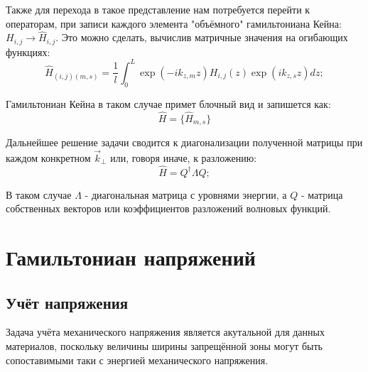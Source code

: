 \documentclass[../main.tex]{subfiles}
\begin{document}
    Также для перехода в такое представление нам потребуется перейти к операторам,
    при записи каждого элемента "объёмного" гамильтониана Кейна: 
    $H_{i,j} \rightarrow \hat{H}_{i,j}$. Это можно сделать, вычислив матричные 
    значения на огибающих функциях:
    \begin{equation}
        \hat{H}_{(i, j)(m, s)} = \frac{1}{l} \int_0^L \exp(- i k_{z, m} z) H_{i,j}(z)
            \exp(i k_{z, s} z) dz;
    \end{equation}

    Гамильтониан Кейна в таком случае примет блочный вид и запишется как:
    \begin{equation}
        \hat H = \{\hat{H}_{m, s}\}
    \end{equation}

    Дальнейшее решение задачи сводится к диагонализации полученной матрицы при 
    каждом конкретном $\vec{k}_\perp$ или, говоря иначе, к разложению:
    \begin{equation*}
        \hat H = Q^{\dagger} \Lambda Q;
    \end{equation*}
     
    В таком случае $\Lambda$ - диагональная матрица с уровнями энергии, а $Q$ - 
    матрица собственных векторов или коэффициентов разложений волновых функций.


    \section{Гамильтониан напряжений}

    \subsection{Учёт напряжения}
    Задача учёта механического напряжения является акутальной для данных материалов, 
    поскольку величины ширины запрещённой зоны могут быть сопоставимыми таки
    с энергией механического напряжения.
\end{document}
